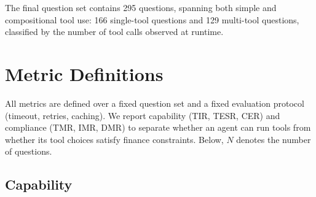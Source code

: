 The final question set contains 295 questions, spanning both simple and compositional tool use: 166 single-tool questions and 129 multi-tool questions, classified by the number of tool calls observed at runtime.

\section{Metric Definitions}
\label{sec:metrics}

All metrics are defined over a fixed question set and a fixed evaluation protocol (timeout, retries, caching).
We report capability (TIR, TESR, CER) and compliance (TMR, IMR, DMR) to separate whether an agent can run tools from whether its tool choices satisfy finance constraints.
Below, $N$ denotes the number of questions.

\subsection{Capability}

